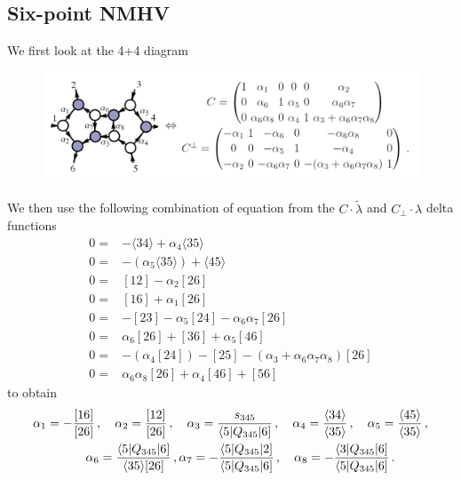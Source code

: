 \documentclass[a4paper,12pt]{article}
\newcommand{\ab}[1]{\langle #1 \rangle}
\newcommand{\sqb}[1]{[ #1 ]}
\newcommand{\aMs}[3]{\langle #1|#2|#3]}  		%
\newcommand{\sab}[1]{s_{#1}}
\newcommand{\twhite}[1]{\textcolor{white}{#1}}
\begin{document}
\subsection*{Six-point NMHV}
We first look at the 4+4 diagram
\begin{figure}[H]
	\centering
	\includegraphics[width=0.9\linewidth]{4+4}
	\caption[4+4]{}
	\label{fig:44}
\end{figure}
We then use the following combination of equation from the $C\cdot\tilde \lambda$ and $C_\perp\cdot \lambda$ delta functions
\begin{equation}
	\begin{aligned}
0=&-\langle 3 4 \rangle + \alpha_{4} \langle 3 5 \rangle
\\
0=&-(\alpha_{5} \langle 3 5 \rangle) + \langle 4 5 \rangle
\\
0=&\left[ 1 2 \right] - \alpha_{2} \left[ 2 6 \right]
\\
0=&\left[ 1 6 \right] + \alpha_{1} \left[ 2 6 \right]
\\
0=&-\left[ 2 3 \right] - \alpha_{5} \left[ 2 4 \right] - \alpha_{6} \alpha_{7} \left[ 2 6 \right]
\\
0=&\alpha_{6} \left[ 2 6 \right] + \left[ 3 6 \right] + \alpha_{5} \left[ 4 6 \right]
\\
0=&-(\alpha_{4} \left[ 2 4 \right]) - \left[ 2 5 \right] - (\alpha_{3} + \alpha_{6} \alpha_{7} \alpha_{8}) \left[ 2 6 \right]
\\
0=&\alpha_{6} \alpha_{8} \left[ 2 6 \right] + \alpha_{4} \left[ 4 6 \right] + \left[ 5 6 \right]
	\end{aligned}
\end{equation}
to obtain
\begin{align*}
	& \alpha_1 = -\frac{[16]}{[26]}\,, \quad \alpha_2 = \frac{[12]}{[26]}\,, \quad \alpha_3 = \frac{\sab{345}}{\aMs{5}{Q_{345}}{6}}\,, \quad \alpha_4 = \frac{\ab{34}}{\ab{35}}\,, \quad
	\alpha_5 = \frac{\ab{45}}{\ab{35}}\,, \\ 
	& \twhite{.}\hspace{1.4cm} 
	\alpha_6 = \frac{\aMs{5}{Q_{345}}{6}}{\ab{35}\sqb{26}}\,, \alpha_7 = -\frac{\aMs{5}{Q_{345}}{2}}{\aMs{5}{Q_{345}}{6}}\,,\quad
	\alpha_8 = - \frac{\aMs{3}{Q_{345}}{6}}{\aMs{5}{Q_{345}}{6}}\,.
\end{align*}
\end{document}
